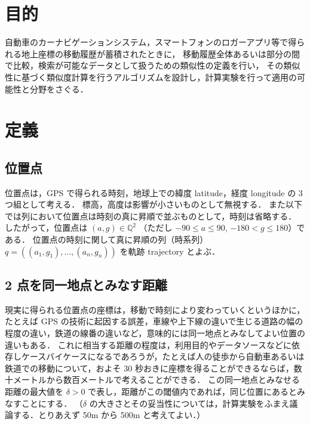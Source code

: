 \documentclass[11pt]{jarticle}
\begin{document}
\section{目的}

自動車のカーナビゲーションシステム，スマートフォンのロガーアプリ等で得られる地上座標の移動履歴が蓄積されたときに，
移動履歴全体あるいは部分の間で比較，検索が可能なデータとして扱うための類似性の定義を行い，
その類似性に基づく類似度計算を行うアルゴリズムを設計し，計算実験を行って適用の可能性と分野をさぐる．

\section{定義}

\subsection{位置点}
位置点は，GPS で得られる時刻，地球上での緯度 latitude，経度 longitude の 3 つ組として考える．
標高，高度は影響が小さいものとして無視する．
また以下では列において位置点は時刻の真に昇順で並ぶものとして，時刻は省略する．
したがって，位置点は $(a, g) \in \mathbb{Q}^2$ （ただし $-90 \leq a \leq 90$, $-180 < g \leq 180$）である．
位置点の時刻に関して真に昇順の列（時系列） $q = ((a_1, g_1), \ldots,(a_n,g_n))$ を軌跡 trajectory とよぶ．

\subsection{2 点を同一地点とみなす距離}
現実に得られる位置点の座標は，移動で時刻により変わっていくというほかに，
たとえば GPS の技術に起因する誤差，車線や上下線の違いで生じる道路の幅の程度の違い，鉄道の線番の違いなど，意味的には同一地点とみなしてよい位置の違いもある．
これに相当する距離の程度は，利用目的やデータソースなどに依存しケースバイケースになるであろうが，たとえば人の徒歩から自動車あるいは鉄道での移動について，およそ 30 秒おきに座標を得ることができるならば，数十メートルから数百メートルで考えることができる．
この同一地点とみなせる距離の最大値を $\delta > 0$ で表し，距離がこの閾値内であれば，同じ位置にあるとみなすことにする．
（$\delta$ の大きさとその妥当性については，計算実験をふまえ議論する．とりあえず 50m から 500m と考えてよい．）
\end{document}

